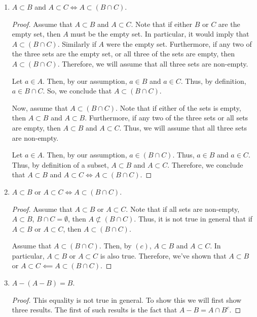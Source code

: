 \documentclass[12pt]{article}
\begin{document}
\begin{enumerate}[label=(\alph*)]
\begin{proof}
		Now, assume that $A \subset (B \cup C)$. For this counterexample, assume that $A, B$, and $C$
		are all non-empty. Furthermore, assume that $B - C$ and $C - B$ are nonempty. Since $A \subset 
		(B \cup C)$, let $a_1, a_2 \in A$ such that $a_1 \in B - C$ and $a_2 \in C - B$. Note then that
		$A \not\subset B$ and $A \not\subset C$ since $a_1 \not\in C$ and $a_2 \not\in B$. Thus,
		we cannot conclude in general that if $A \subset (B \cup C)$, then $A \subset B$ or $A \subset C$.
		Therefore, we can only conclude that $A \subset B$ or $A \subset C \implies A \subset (B \cup C)$.
	\end{proof}
	\item $A \subset B$ and $A \subset C \iff A \subset (B \cap C)$.
	\begin{proof}
		Assume that $A \subset B$ and $A \subset C$. Note that if either $B$ or $C$ are the empty set,
		then $A$ must be the empty set. In particular, it would imply that $A \subset (B \cap C)$.
		Similarly if $A$ were the empty set. Furthermore, if any two of the three sets are the empty
		set, or all three of the sets are empty, then $A \subset (B \cap C)$. Therefore, we will
		assume that all three sets are non-empty.
		
		Let $a \in A$. Then, by our assumption, $a \in B$ and $a \in C$. Thus, by definition,
		$a \in B \cap C$. So, we conclude that $A \subset (B \cap C)$.
		
		Now, assume that $A \subset (B \cap C)$. Note that if either of the sets is empty,
		then $A \subset B$ and $A \subset B$. Furthermore, if any two of the three sets or all sets
		are empty, then $A \subset B$ and $A \subset C$. Thus, we will assume that all three sets are 
		non-empty.
		
		Let $a \in A$. Then, by our assumption, $a \in (B \cap C)$. Thus, $a \in B$ and $a \in C$.
		Thus, by definition of a subset, $A \subset B$ and $A \subset C$. Therefore, we conclude that 
		$A \subset B$ and $A \subset C \iff A \subset (B \cap C)$.
	\end{proof}
	\item $A \subset B$ or $A \subset C \iff A \subset (B \cap C)$.
	\begin{proof}
		Assume that $A \subset B$ or $A \subset C$. Note that if all sets are non-empty, $A \subset B$,
		$B \cap C = \emptyset$, then $A \not\subset (B \cap C)$. Thus, it is not true in general that 
		if $A \subset B$ or $A \subset C$, then $A \subset (B \cap C)$.
		
		Assume that $A \subset (B \cap C)$. Then, by $(c)$, $A \subset B$ and $A \subset C$.
		In particular, $A \subset B$ or $A \subset C$ is also true. Therefore, we've shown that 
		$A \subset B$ or $A \subset C \impliedby A \subset (B \cap C)$. 
	\end{proof} 
	\item $A - (A - B) = B$.
	\begin{proof}
		This equality is not true in general. To show this we will first show three results. The first
		of such results is the fact that $A - B = A \cap B^{c}$. 
		

\end{proof}
\end{enumerate}
\end{document}
